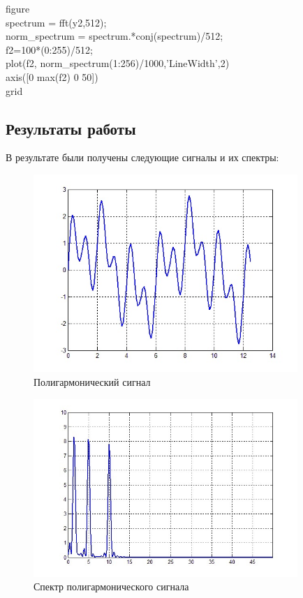 \documentclass[10pt,a4paper]{article}
\begin{document}
\begin{flushleft}
figure\\
spectrum = fft(y2,512);\\
norm\_spectrum = spectrum.*conj(spectrum)/512;\\
f2=100*(0:255)/512;\\
plot(f2, norm\_spectrum(1:256)/1000,'LineWidth',2)\\
axis([0 max(f2) 0 50])\\
grid\\
\end{flushleft}
\subsection{Результаты работы}
В результате были получены следующие сигналы и их спектры:

\begin{figure}[h]
\centering
\includegraphics[width=10cm]{5_1} 
\caption{Полигармонический сигнал} 
\label{fig.l5_1} 
\end{figure}
\begin{figure}[h]
\centering
\includegraphics[width=10cm]{5_2}
\caption{Спектр полигармонического сигнала} 
\label{fig.l5_2} 
\end{figure}
\end{document}
